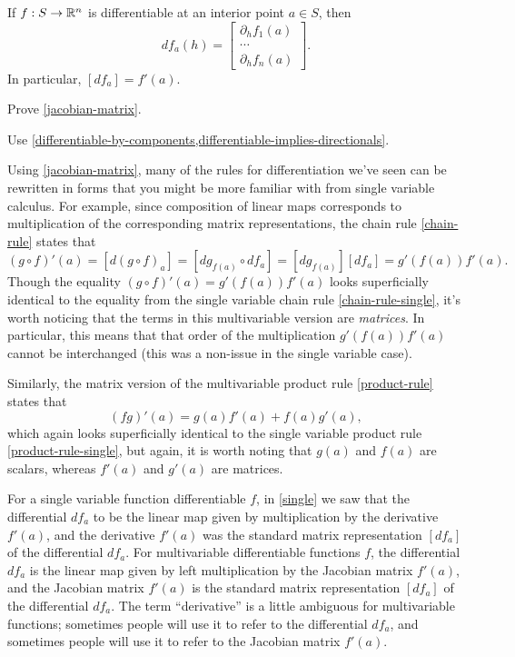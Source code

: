 \begin{theorem} \label{jacobian-matrix}
	If $f : S \to \mathbb{R}^n$ is differentiable at an interior point $a \in S$, then \[ df_a(h) = \begin{bmatrix} \partial_h f_1(a) \\ \cdots \\ \partial_h f_n(a) \end{bmatrix}. \]
	In particular, $[df_a] = f'(a)$. 
\end{theorem}

\begin{exercise}
	Prove \cref{jacobian-matrix}. \begin{hint} Use \cref{differentiable-by-components,differentiable-implies-directionals}. \end{hint}
\end{exercise}

Using \cref{jacobian-matrix}, many of the rules for differentiation we've seen can be rewritten in forms that you might be more familiar with from single variable calculus. For example, since composition of linear maps corresponds to multiplication of the corresponding matrix representations, the chain rule \ref{chain-rule} states that 
\[ (g \circ f)'(a) = [d(g \circ f)_a] = [dg_{f(a)} \circ df_a] = [dg_{f(a)}] [df_a] = g'(f(a)) f'(a). \]
Though the equality $(g \circ f)'(a) = g'(f(a)) f'(a)$ looks superficially identical to the equality from the single variable chain rule \ref{chain-rule-single}, it's worth noticing that the terms in this multivariable version are \emph{matrices}. In particular, this means that that order of the multiplication $g'(f(a))f'(a)$ cannot be interchanged (this was a non-issue in the single variable case). 

Similarly, the matrix version of the multivariable product rule \ref{product-rule} states that 
\[ (fg)'(a) = g(a)f'(a) + f(a)g'(a), \]
which again looks superficially identical to the single variable product rule \ref{product-rule-single}, but again, it is worth noting that $g(a)$ and $f(a)$ are scalars, whereas $f'(a)$ and $g'(a)$ are matrices. 

\begin{unimportantremark}
	For a single variable function differentiable $f$, in \cref{single} we saw that the differential $df_a$ to be the linear map given by multiplication by the derivative $f'(a)$, and the derivative $f'(a)$ was the standard matrix representation $[df_a]$ of the differential $df_a$. For multivariable differentiable functions $f$, the differential $df_a$ is the linear map given by left multiplication by the Jacobian matrix $f'(a)$, and the Jacobian matrix $f'(a)$ is the standard matrix representation $[df_a]$ of the differential $df_a$. The term ``derivative'' is a little ambiguous for multivariable functions; sometimes people will use it to refer to the differential $df_a$, and sometimes people will use it to refer to the Jacobian matrix $f'(a)$. 
\end{unimportantremark}

